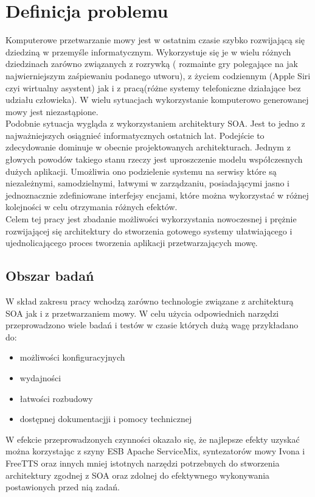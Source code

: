 \section{Definicja problemu } %
Komputerowe przetwarzanie mowy jest w ostatnim czasie szybko rozwijającą się dziedziną w przemyśle informatycznym. Wykorzystuje się je w wielu różnych dziedzinach zarówno związanych z rozrywką ( rozmainte gry polegające na jak najwierniejszym zaśpiewaniu podanego utworu), z życiem codziennym (Apple Siri czyi wirtualny asystent) jak i z pracą(różne systemy telefoniczne działające bez udziału człowieka). W wielu sytuacjach wykorzystanie komputerowo generowanej mowy jest niezastąpione.\\
Podobnie sytuacja wygląda z wykorzystaniem architektury SOA. Jest to jedno z najważniejszych osiągnieć informatycznych ostatnich lat. Podejście to zdecydowanie dominuje w obecnie projektowanych architekturach. Jednym z głowych powodów takiego stanu rzeczy jest uproszczenie modelu współczesnych dużych aplikacji. Umożliwia ono podzielenie systemu na serwisy które są niezależnymi, samodzielnymi, łatwymi w zarządzaniu, posiadającymi jasno i jednoznacznie zdefiniowane interfejsy encjami, które można wykorzystać w różnej kolejności w celu otrzymania różnych efektów. \\
Celem tej pracy jest zbadanie możliwości wykorzystania nowoczesnej i prężnie rozwijającej się architektury do stworzenia gotowego systemy ułatwiającego i ujednolicającego proces tworzenia aplikacji przetwarzających mowę.
 


\subsection{Obszar badań} %
W skład zakresu pracy wchodzą zarówno technologie związane z architekturą SOA jak i z przetwarzaniem mowy. W celu użycia odpowiednich narzędzi przeprowadzono wiele badań i testów w czasie których dużą wagę przykładano do:
\begin{itemize}
 	\item możliwości konfiguracyjnych
	\item wydajności
	\item łatwości rozbudowy
	\item dostępnej dokumentacjji i pomocy technicznej
\end{itemize}
W efekcie przeprowadzonych czynności okazało się, że najlepsze efekty uzyskać można korzystając z szyny ESB  Apache ServiceMix,  syntezatorów mowy Ivona i FreeTTS oraz innych mniej istotnych narzędzi potrzebnych do stworzenia architektury zgodnej z SOA oraz zdolnej do efektywnego wykonywania postawionych przed nią zadań. 


